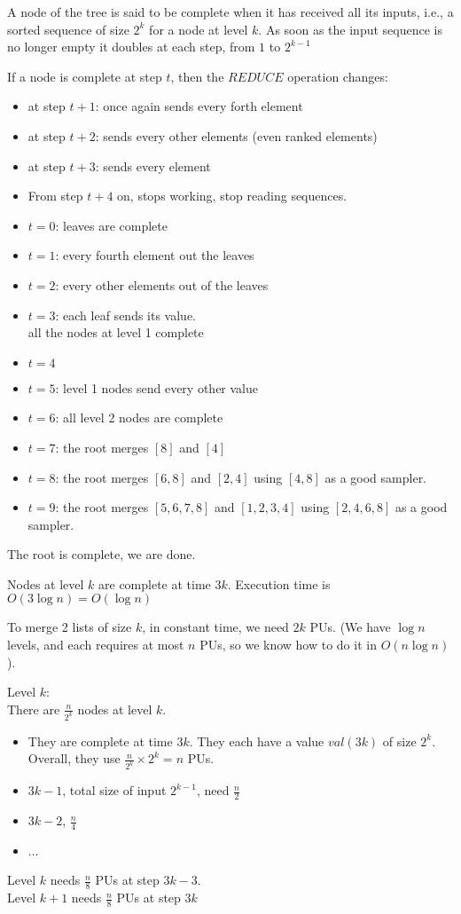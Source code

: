 A node of the tree is said to be complete when it has received all its inputs, i.e., a sorted sequence of size $2^k$ for a node at level $k$. As soon as the input sequence is no longer empty it doubles at each step, from $1$ to $2^{k-1}$

If a node is complete at step $t$, then the $REDUCE$ operation changes:
\begin{itemize}
\item at step $t+1$: once again sends every forth element
\item at step $t+2$: sends every other elements (even ranked elements) %
\item at step $t+3$: sends every element
\item From step $t+4$ on, stops working, stop reading sequences.
\end{itemize}


\begin{itemize}
\item $t=0$: leaves are complete
\item $t=1$: every fourth element out the leaves
\item $t=2$: every other elements out of the leaves
\item $t=3$: each leaf sends its value.\\
all the nodes at level 1 complete
\item $t=4$
\item $t=5$: level 1 nodes send every other value
\item $t=6$: all level 2 nodes are complete
\item $t=7$: the root merges $[8]$ and $[4]$
\item $t=8$: the root merges $[6,8]$ and $[2,4]$ using $[4,8]$ as a good sampler.
\item $t=9$: the root merges $[5,6,7,8]$ and $[1,2,3,4]$ using $[2,4,6,8]$ as a good sampler.
\end{itemize}
The root is complete, we are done.

 Nodes at level $k$ are complete at time $3k$. Execution time is $O(3 \log n)= O(\log n)$

 To merge 2 lists of size $k$, in constant time, we need $2k$ PUs. (We have $\log n$ levels, and each requires at most $n$ PUs, so we know how to do it in $O(n \log n)$).

Level $k$:\\
There are $\frac{n}{2^k}$ nodes at level $k$.
\begin{itemize}
\item They are complete at time $3k$. They each have a value $val(3k)$ of size $2^k$. Overall, they use $\frac{n}{2^k}\times 2^k=n$ PUs.
\item $3k-1$, total size of input $2^{k-1}$, need $\frac{n}{2}$
\item $3k-2$, $\frac{n}{4}$
\item ...
\end{itemize}
Level $k$ needs $\frac{n}{8}$ PUs at step $3k-3$.\\
Level $k+1$ needs $\frac{n}{8}$ PUs at step $3k$

